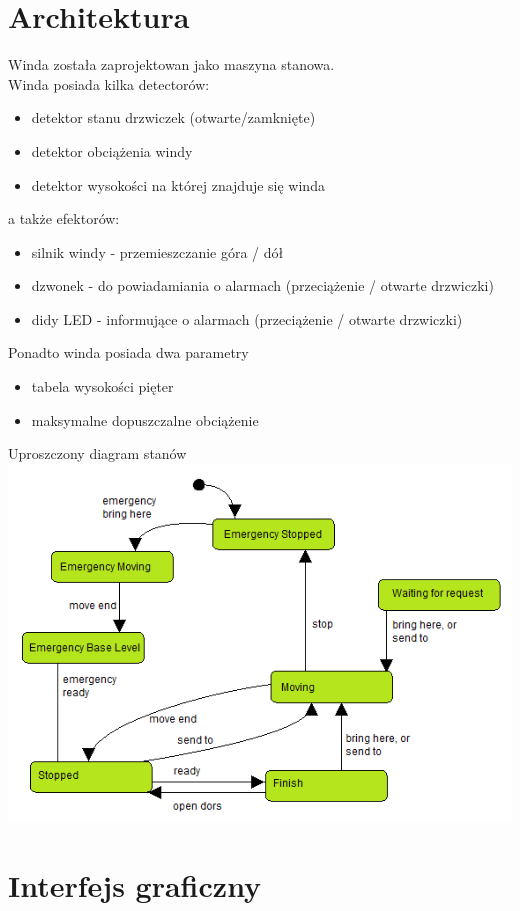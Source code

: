 \documentclass[a4paper,11pt]{article}
\begin{document}
\section{Architektura}
	Winda została zaprojektowan jako maszyna stanowa. \\	
	Winda posiada kilka detectorów:
	\begin{itemize}
		\item detektor stanu drzwiczek (otwarte/zamknięte)
		\item detektor obciążenia windy
		\item detektor wysokości na której znajduje się winda
	\end{itemize}
	a także efektorów:
	\begin{itemize}
		\item silnik windy - przemieszczanie góra / dół
		\item dzwonek - do powiadamiania o alarmach (przeciążenie / otwarte drzwiczki)
		\item didy LED - informujące o alarmach (przeciążenie / otwarte drzwiczki)
	\end{itemize}
	Ponadto winda posiada dwa parametry
	\begin{itemize}
		\item tabela wysokości pięter
		\item maksymalne dopuszczalne obciążenie
	\end{itemize}
	Uproszczony diagram stanów \\
	\includegraphics{images/simplifiedStateChart.png}
	
\section{Interfejs graficzny}
	
\end{document}

